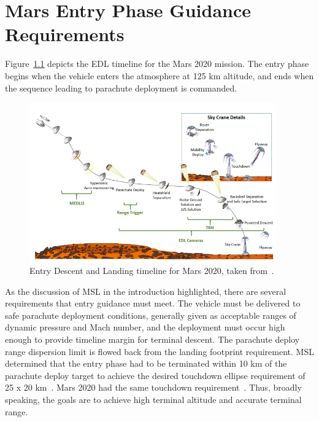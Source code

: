 \chapter{Mars Entry Phase Guidance Requirements}\label{Ch:EGConcepts}
Figure~\ref{Fig:M2020Timeline} depicts the EDL timeline for the Mars 2020 mission. The entry phase begins when the vehicle enters the atmosphere at 125 km altitude, and ends when the sequence leading to parachute deployment is commanded. 
\begin{figure}[h!]
	\centering
	\includegraphics[width=0.95\textwidth]{Images/Mars2020Timeline}
	\caption{Entry Descent and Landing timeline for Mars 2020, taken from~\cite{M2020_EDL}.}
	\label{Fig:M2020Timeline}
\end{figure}
As the discussion of MSL in the introduction highlighted, there are several requirements that entry guidance must meet. 
The vehicle must be delivered to safe parachute deployment conditions, generally given as acceptable ranges of dynamic pressure and Mach number, and the deployment must occur high enough to provide timeline margin for terminal descent. The parachute deploy range dispersion limit is flowed back from the landing footprint requirement. MSL determined that the entry phase had to be terminated within 10 km of the parachute deploy target to achieve the desired touchdown ellipse requirement of 25 x 20 km~\cite{MSL_EDL2}. Mars 2020 had the same touchdown requirement~\cite{M2020_EDL}.
Thus, broadly speaking, the goals are to achieve high terminal altitude and accurate terminal range. 

